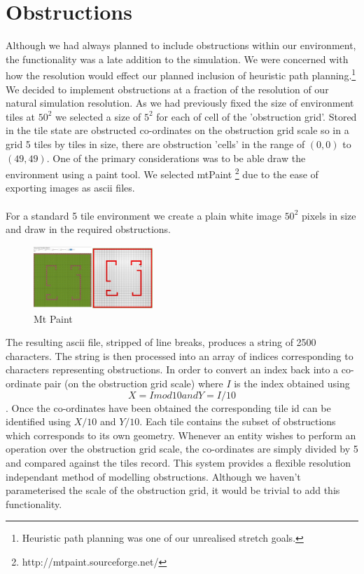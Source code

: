 \documentclass[10pt, a4paper, conference, compsocconf]{IEEEtran}
\begin{document}
\section{Obstructions \label{obstructions}}
Although we had always planned to include obstructions within our environment, the functionality was a late addition to the simulation. We were concerned with how the resolution would effect our planned inclusion of heuristic path planning.\footnote{Heuristic path planning was one of our unrealised stretch goals.} We decided to implement obstructions at a fraction of the resolution of our natural simulation resolution. As we had previously fixed the size of environment tiles at \(50^2\) we selected a size of \(5^2\) for each of cell of the 'obstruction grid'. Stored in the tile state are obstructed co-ordinates on the obstruction grid scale so in a grid 5 tiles by tiles in size, there are obstruction 'cells' in the range of \( (0,0) \) to \( (49,49) \). One of the primary considerations was to be able draw the environment using a paint tool. We selected mtPaint \footnote{http://mtpaint.sourceforge.net/} due to the ease of exporting images as ascii files.\\
\\
For a standard 5 tile environment we create a plain white image \(50^2\) pixels in size and draw in the required obstructions.

\begin{figure}[h]
  \centering
  \includegraphics[width=0.4\textwidth]{../img/mt_paint.png}
\caption{Mt Paint}
    \label{fig:mtpaint}
\end{figure}

The resulting ascii file, stripped of line breaks, produces a string of 2500 characters. The string is then processed into an array of indices corresponding to characters representing obstructions. In order to convert an index back into a co-ordinate pair (on the obstruction grid scale) where \(I\) is the index obtained using \[X = I mod 10 and Y = I / 10\].
Once the co-ordinates have been obtained the corresponding tile id can be identified using \(X / 10\) and \(Y / 10\). Each tile contains the subset of obstructions which corresponds to its own geometry. Whenever an entity wishes to perform an operation over the obstruction grid scale, the co-ordinates are simply divided by 5 and compared against the tiles record. This system provides a flexible resolution independant method of modelling obstructions. Although we haven't parameterised the scale of the obstruction grid, it would be trivial to add this functionality.
\end{document}
